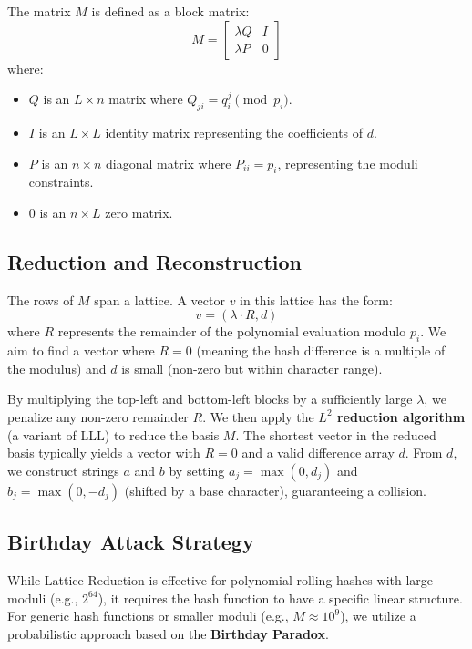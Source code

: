 \documentclass[11pt]{article}
\begin{document}
The matrix $M$ is defined as a block matrix:
\[
M = 
\begin{bmatrix}
\lambda Q & I \\
\lambda P & 0 
\end{bmatrix}
\]
where:
\begin{itemize}
    \item $Q$ is an $L \times n$ matrix where $Q_{ji} = q_i^j \pmod{p_i}$.
    \item $I$ is an $L \times L$ identity matrix representing the coefficients of $d$.
    \item $P$ is an $n \times n$ diagonal matrix where $P_{ii} = p_i$, representing the moduli constraints.
    \item $0$ is an $n \times L$ zero matrix.
\end{itemize}

\subsection{Reduction and Reconstruction}
The rows of $M$ span a lattice. A vector $v$ in this lattice has the form:
\[
v = (\lambda \cdot R, d)
\]
where $R$ represents the remainder of the polynomial evaluation modulo $p_i$. We aim to find a vector where $R=0$ (meaning the hash difference is a multiple of the modulus) and $d$ is small (non-zero but within character range).

By multiplying the top-left and bottom-left blocks by a sufficiently large $\lambda$, we penalize any non-zero remainder $R$. We then apply the \textbf{$L^2$ reduction algorithm} (a variant of LLL) to reduce the basis $M$. The shortest vector in the reduced basis typically yields a vector with $R=0$ and a valid difference array $d$. From $d$, we construct strings $a$ and $b$ by setting $a_j = \max(0, d_j)$ and $b_j = \max(0, -d_j)$ (shifted by a base character), guaranteeing a collision.

\subsection{Birthday Attack Strategy}
\label{appx:birthday_paradox}

While Lattice Reduction is effective for polynomial rolling hashes with large moduli (e.g., $2^{64}$), it requires the hash function to have a specific linear structure. For generic hash functions or smaller moduli (e.g., $M \approx 10^9$), we utilize a probabilistic approach based on the \textbf{Birthday Paradox}.
\end{document}
